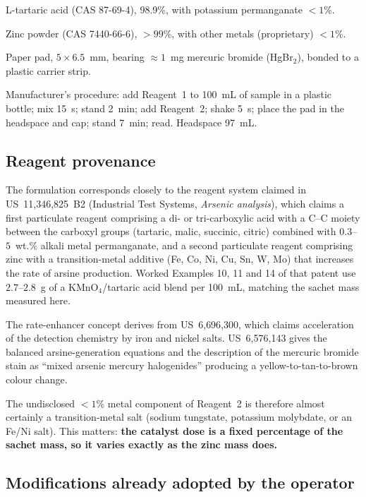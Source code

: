 \documentclass[11pt,a4paper]{article}
\begin{document}
\begin{description}[leftmargin=2.2cm,style=nextline]
  \item[Reagent 1] L-tartaric acid (CAS 87-69-4), 98.9\%, with
        potassium permanganate $<1$\%.
  \item[Reagent 2] Zinc powder (CAS 7440-66-6), $>99$\%, with other
        metals (proprietary) $<1$\%.
  \item[Indicator] Paper pad, $5 \times 6.5$~mm, bearing $\approx 1$~mg
        mercuric bromide (HgBr$_2$), bonded to a plastic carrier strip.
\end{description}

\noindent
Manufacturer's procedure: add Reagent~1 to 100~mL of sample in a plastic
bottle; mix 15~s; stand 2~min; add Reagent~2; shake 5~s; place the pad in
the headspace and cap; stand 7~min; read. Headspace 97~mL.

\subsection{Reagent provenance}

The formulation corresponds closely to the reagent system claimed in
US~11{,}346{,}825~B2 (Industrial Test Systems, \emph{Arsenic analysis}),
which claims a first particulate reagent comprising a di- or tri-carboxylic
acid with a C--C moiety between the carboxyl groups (tartaric, malic,
succinic, citric) combined with $0.3$--$5$~wt.\% alkali metal permanganate,
and a second particulate reagent comprising zinc with a transition-metal
additive (Fe, Co, Ni, Cu, Sn, W, Mo) that increases the rate of arsine
production. Worked Examples 10, 11 and 14 of that patent use
$2.7$--$2.8$~g of a KMnO$_4$/tartaric acid blend per 100~mL, matching the
sachet mass measured here.

The rate-enhancer concept derives from US~6{,}696{,}300, which claims
acceleration of the detection chemistry by iron and nickel salts.
US~6{,}576{,}143 gives the balanced arsine-generation equations and the
description of the mercuric bromide stain as ``mixed arsenic mercury
halogenides'' producing a yellow-to-tan-to-brown colour change.

The undisclosed $<1$\% metal component of Reagent~2 is therefore almost
certainly a transition-metal salt (sodium tungstate, potassium molybdate,
or an Fe/Ni salt). This matters: \textbf{the catalyst dose is a fixed
percentage of the sachet mass, so it varies exactly as the zinc mass does.}

\subsection{Modifications already adopted by the operator}
\end{document}
